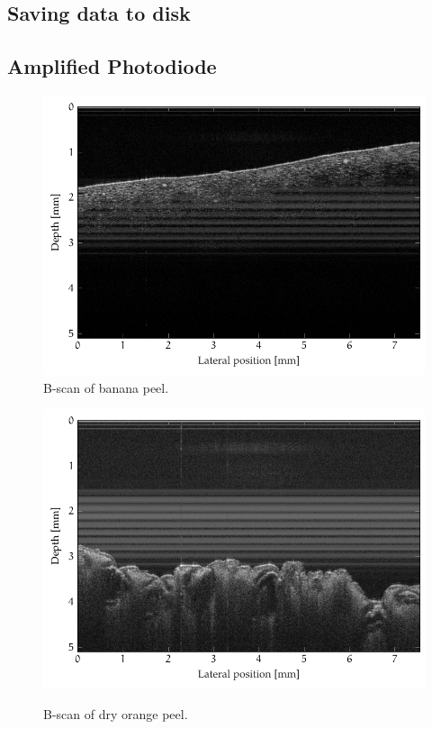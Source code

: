 \subsection{Saving data to disk}

\subsection{Amplified Photodiode}


\begin{figure}[hbt]
	\centering
	\includegraphics[width=\linewidth]{gfx/tikz/axsun/banana-peel}
	\caption{B-scan of banana peel.}\label{fig:banana-peel}
\end{figure}%
\begin{figure}[hbt]
	\myfloatalign
	{\includegraphics[width=\linewidth]{gfx/tikz/axsun/dry-orange-peel}}
	\caption{B-scan of dry orange peel.}\label{fig:dry-orange-peel}
\end{figure}%

